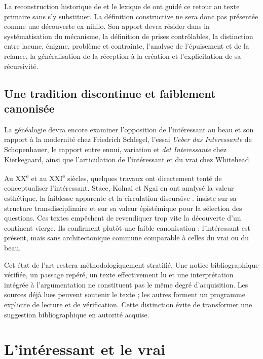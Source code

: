 \documentclass[11pt,a4paper]{article}
\begin{document}
La reconstruction historique de \textcite{nannini2018garve} et le lexique de
\textcite{nannini2018interesting} ont guidé ce retour au texte primaire sans s'y
substituer. La définition constructive ne sera donc pas présentée comme une
découverte ex nihilo. Son apport devra résider dans la systématisation du
mécanisme, la définition de prises contrôlables, la distinction entre lacune,
énigme, problème et contrainte, l'analyse de l'épuisement et de la relance, la
généralisation de la réception à la création et l'explicitation de sa
récursivité.

\subsection{Une tradition discontinue et faiblement canonisée}

La généalogie devra encore examiner l'opposition de l'intéressant au beau et son
rapport à la modernité chez Friedrich Schlegel, l'essai \emph{Ueber das
Interessante} de Schopenhauer, le rapport entre ennui, variation et
\emph{det Interessante} chez Kierkegaard, ainsi que l'articulation de
l'intéressant et du vrai chez Whitehead.

Au XX\textsuperscript{e} et au XXI\textsuperscript{e} siècles, quelques travaux
ont directement tenté de conceptualiser l'intéressant. Stace, Kolnai et Ngai en
ont analysé la valeur esthétique, la faiblesse apparente et la circulation
discursive
\parencite{stace1944interestingness,kolnai1964concept,ngai2008merely,ngai2012categories}.
\textcite{epstein2009interesting} insiste sur sa structure transdisciplinaire et
\textcite{grimm2011interesting} sur sa valeur épistémique pour la sélection des
questions. Ces textes empêchent de revendiquer trop vite la découverte d'un
continent vierge. Ils confirment plutôt une faible canonisation : l'intéressant
est présent, mais sans architectonique commune comparable à celles du vrai ou du
beau.

Cet état de l'art restera méthodologiquement stratifié. Une notice
bibliographique vérifiée, un passage repéré, un texte effectivement lu et une
interprétation intégrée à l'argumentation ne constituent pas le même degré
d'acquisition. Les sources déjà lues peuvent soutenir le texte ; les autres
forment un programme explicite de lecture et de vérification. Cette distinction
évite de transformer une suggestion bibliographique en autorité acquise.

\section{L'intéressant et le vrai}
\end{document}
